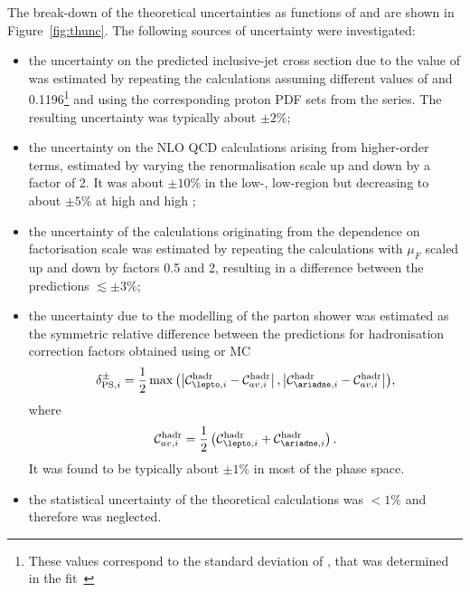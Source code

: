 The break-down of the theoretical uncertainties as functions of \etjetb and \qsq are shown in Figure~\ref{fig:thunc}. The following sources of uncertainty were investigated:
\begin{itemize}
 \item the uncertainty on the predicted inclusive-jet cross section due to the value of \asz was estimated by repeating the calculations assuming different values of  and 0.1196\footnote{These values correspond to the standard deviation of \as, that was determined in the \herapdf fit~\cite{upub:herapdf1.5}} and using the corresponding proton PDF sets from the  series. The resulting uncertainty was typically about $\pm2\%$;
 \item the uncertainty on the NLO QCD calculations arising from higher-order terms, estimated by varying the renormalisation scale up and down by a factor of 2. It was about $\pm10\%$ in the low-\qsq, low-\etjetb region but decreasing to about $\pm5\%$ at high \qsq and high \etjetb;
 \item the uncertainty of the calculations originating from the dependence on factorisation scale was estimated by repeating the calculations with $\mu_F$ scaled up and down by factors 0.5 and 2, resulting in a difference between the predictions $\lesssim\pm 3\%$;
 \item the uncertainty due to the modelling of the parton shower was estimated as the symmetric relative difference between the predictions for hadronisation correction factors obtained using \lepto or \ariadne MC
\begin{equation}
\delta^{\pm}_{\text{PS},i} = \frac{1}{2}\max{\left(\left|\mathcal{C}^\text{hadr}_{\lepto,i} - \mathcal{C}^\text{hadr}_{av,i}\right|,\left|\mathcal{C}^\text{hadr}_{\ariadne,i} - \mathcal{C}^\text{hadr}_{av,i}\right|\right)},
\label{eq:hadrcorunc}
\end{equation}
where
\begin{equation}
\mathcal{C}^\text{hadr}_{av,i} = \frac{1}{2}\left(\mathcal{C}^\text{hadr}_{\lepto,i}+\mathcal{C}^\text{hadr}_{\ariadne,i}\right).\notag
\end{equation}
 It was found to be typically about $\pm 1\%$ in most of the phase space.
\item the statistical uncertainty of the theoretical calculations was $<1\%$ and therefore was neglected.

\end{itemize}
